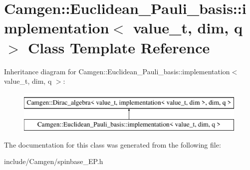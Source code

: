 \hypertarget{a00283}{\section{Camgen\-:\-:Euclidean\-\_\-\-Pauli\-\_\-basis\-:\-:implementation$<$ value\-\_\-t, dim, q $>$ Class Template Reference}
\label{a00283}
}
Inheritance diagram for Camgen\-:\-:Euclidean\-\_\-\-Pauli\-\_\-basis\-:\-:implementation$<$ value\-\_\-t, dim, q $>$\-:\begin{figure}[H]
\begin{center}
\leavevmode
\includegraphics[height=2.000000cm]{a00283}
\end{center}
\end{figure}


The documentation for this class was generated from the following file\-:\begin{DoxyCompactItemize}
\item 
include/\-Camgen/spinbase\-\_\-\-E\-P.\-h\end{DoxyCompactItemize}

